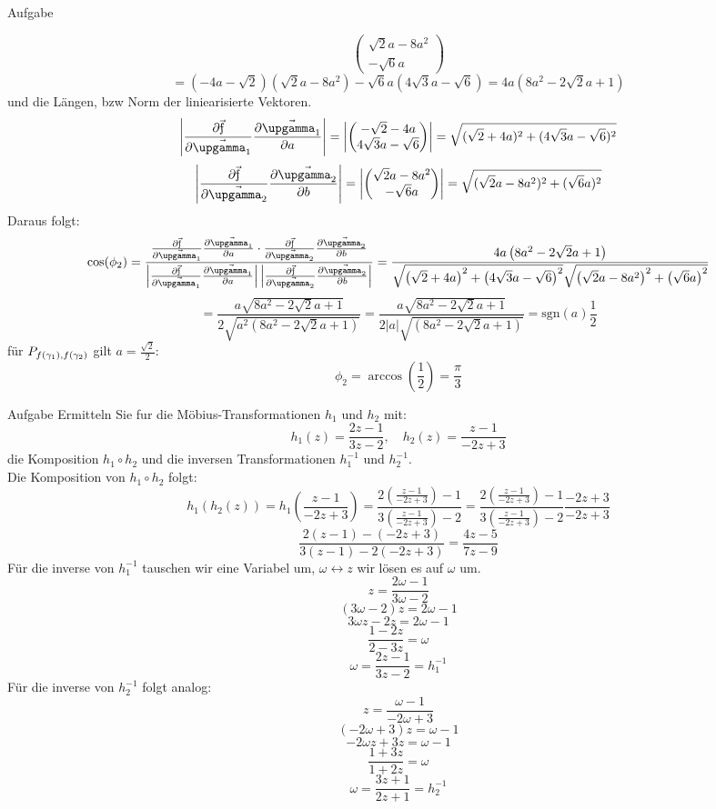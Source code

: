 \documentclass{scrartcl}
\begin{document}
\begin{section}{Aufgabe}
\begin{itemize}
\[\begin{pmatrix}
    \sqrt{2} a-8 a^2  \\
    -\sqrt{6} a
\end{pmatrix}\]
\[=\left(-4 a-\sqrt{2}\right) \left(\sqrt{2} a-8 a^2\right)-\sqrt{6} a \left(4 \sqrt{3} a-\sqrt{6}\right)
=4 a \left(8 a^2-2 \sqrt{2} a+1\right)\] und die Längen, bzw Norm der liniearisierte Vektoren. 
\[\left|\pfa\right|=\left|\begin{pmatrix}
    -\sqrt{2}-4a\\
    4\sqrt{3}a-\sqrt{6}
\end{pmatrix}\right|=\sqrt{(\sqrt{2}+4a)^2+(4\sqrt{3}a-\sqrt{6})^2}\] 
\[\left|\pfb\right|=\left|\begin{pmatrix}
    \sqrt{2} a-8 a^2  \\
    -\sqrt{6} a
\end{pmatrix}\right|=\sqrt{(\sqrt{2}a-8a^2)^2+(\sqrt{6} a)^2}\] 
Daraus folgt:
\[\cos(\phi_2)=\frac{\pfa\cdot\pfb}{\left|\pfa\right|\left|\pfb\right|}
=\frac{4 a \left(8 a^2-2 \sqrt{2} a+1\right)}{\sqrt{\left(\sqrt{2}+4a\right)^2+\left(4\sqrt{3}a-\sqrt{6}\right)^2}\sqrt{\left(\sqrt{2}a-8a^2\right)^2+\left(\sqrt{6} a\right)^2}}
\]
\[=\frac{a \sqrt{8 a^2-2 \sqrt{2} a+1}}{2 \sqrt{a^2 \left(8 a^2-2 \sqrt{2} a+1\right)}}
=\frac{a \sqrt{8 a^2-2 \sqrt{2} a+1}}{2 \left|a\right| \sqrt{ \left(8 a^2-2 \sqrt{2} a+1\right)}}=\text{sgn}(a)\frac{1}{2}\]
für \(\schnt{f(\gamma_1)}{f(\gamma_2)}{P}\) gilt $a=\frac{\sqrt 2}{2}$:
\[\phi_2=\arccos(\frac{1}{2})=\frac{\pi}{3}\]
\end{itemize}


\end{section}
\begin{section}{Aufgabe}%
Ermitteln Sie fur die Möbius-Transformationen $h_1$ und $h_2$ mit:
\[h_1(z)=\frac{2z-1}{3z-2},\quad h_2(z)=\frac{z-1}{-2z+3}\]
die Komposition $h_1 \circ h_2$ und die inversen Transformationen $h_1^{-1}$ und $h_2^{-1}$.
\\
Die Komposition von $h_1 \circ h_2$ folgt:
\[h_1(h_2(z))=h_1\left(\frac{z-1}{-2z+3}\right)=\frac{2\left(\frac{z-1}{-2z+3}\right)-1}{3\left(\frac{z-1}{-2z+3}\right)-2}=\frac{2\left(\frac{z-1}{-2z+3}\right)-1}{3\left(\frac{z-1}{-2z+3}\right)-2}\frac{-2z+3}{-2z+3}\]
\[\frac{2 (z-1)-(-2z+3)}{3\left(z-1\right)-2(-2z+3)}=\frac{4 z -5}{7 z -9}\]
Für die inverse von $h_1^{-1}$
tauschen wir eine Variabel um, \(\omega \longleftrightarrow z\)
wir lösen es auf $\omega$ um.
\[z=\frac{2\omega -1}{3 \omega -2}\]
\[(3 \omega -2)z=2\omega -1\]
\[3\omega z -2z=2\omega -1\]
\[\frac{1 -2z}{2-3z}=\omega\]
\[\omega=\frac{2z-1}{3z-2}=h_1^{-1}\]
Für die inverse von $h_2^{-1}$ folgt analog:
\[z=\frac{\omega -1}{-2 \omega+3}\]
\[(-2 \omega+3)z=\omega -1\]
\[-2 \omega z+3z=\omega -1\]
\[\frac{1 +3z}{1+2z}=\omega\]
\[\omega=\frac{3z+1}{2z+1}=h_2^{-1}\]
\end{section}
\end{document}
